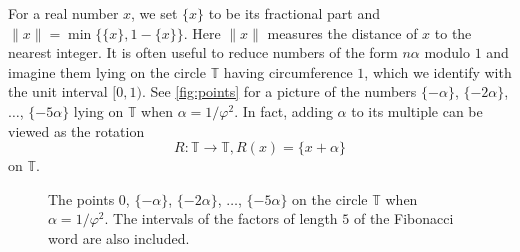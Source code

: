 \documentclass[a4paper,fleqn]{article}
\providecommand{\norm}[1]{\lVert#1\rVert}
\newcommand{\T}{\mathbb{T}}
\begin{document}
  For a real number $x$, we set $\{x\}$ to be its fractional part and $\norm{x} = \min\{\{x\}, 1 - \{x\}\}$. Here
  $\norm{x}$ measures the distance of $x$ to the nearest integer. It is often useful to reduce numbers of the form
  $n\alpha$ modulo $1$ and imagine them lying on the circle $\T$ having circumference $1$, which we identify with the
  unit interval $[0, 1)$. See \autoref{fig:points} for a picture of the numbers $\{-\alpha\}$, $\{-2\alpha\}$,
  $\ldots$, $\{-5\alpha\}$ lying on $\T$ when $\alpha = 1/\varphi^2$. In fact, adding $\alpha$ to its multiple can be
  viewed as the rotation
  \begin{equation*}
    R\colon \T \to \T, R(x) = \{x + \alpha\}
  \end{equation*}
  on $\T$.

  \begin{figure}
   \centering
   \caption{The points $0$, $\{-\alpha\}$, $\{-2\alpha\}$, $\ldots$, $\{-5\alpha\}$ on the circle $\T$ when
            $\alpha = 1/\varphi^2$. The intervals of the factors of length $5$ of the Fibonacci word are also
            included.}
   \label{fig:points}
  \end{figure}
 
\end{document}
